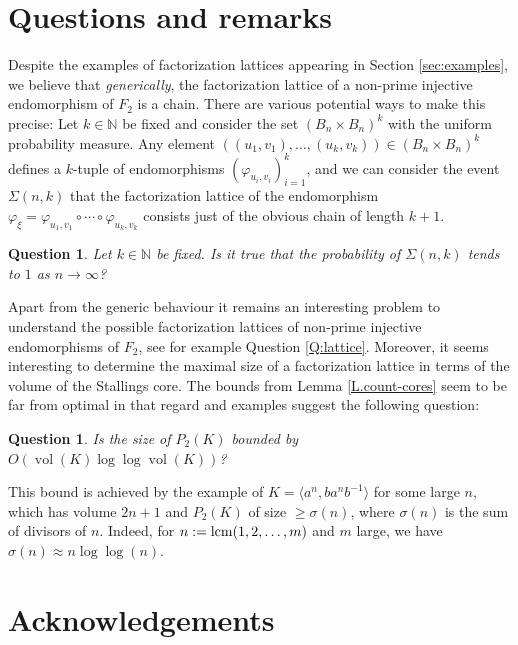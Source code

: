\documentclass{amsproc}
\newtheorem{question}[theorem]{Question}
\newcommand{\vol}{\operatorname{vol}}
\begin{document}
\section{Questions and remarks}\label{S.questions}

Despite the examples of factorization lattices appearing in Section \ref{sec:examples}, we believe that \emph{generically}, the factorization lattice of a non-prime injective endomorphism of $F_2$ is a chain. There are various potential ways to make this precise: Let $k \in \mathbb N$ be fixed and consider the set $(B_n \times B_n)^k$ with the uniform probability measure. Any element $((u_1,v_1),\ldots,(u_k,v_k)) \in (B_n \times B_n)^k$ defines a $k$-tuple of endomorphisms $(\varphi_{u_i,v_i})_{i=1}^k$, and we can consider the event $\Sigma(n,k)$ that the factorization lattice of the endomorphism $\varphi_\xi = \varphi_{u_1,v_1} \circ \cdots \circ \varphi_{u_k,v_k}$ consists just of the obvious chain of length $k+1$.

\begin{question}
    \label{Q.generic-chain} Let $k \in \mathbb N$ be fixed.
    Is it true that the probability of $\Sigma(n,k)$ tends to $1$ as $n \to \infty$?
\end{question}

Apart from the generic behaviour it remains an interesting problem to understand the possible factorization lattices of non-prime injective endomorphisms of $F_2$, see for example Question \ref{Q:lattice}. Moreover, it seems interesting to determine the maximal size of a factorization lattice in terms of the volume of the Stallings core. The bounds from Lemma \ref{L.count-cores} seem to be far from optimal in that regard and examples suggest the following question:

\begin{question}
Is the size of $P_2(K)$ bounded by $O(\vol(K) \log \log \vol(K))$?
\end{question}

This bound is achieved by the example of $K=\langle a^n,b a^n b^{-1}\rangle$ for some large $n$, which has volume $2n+1$ and $P_2(K)$ of size $\geq \sigma(n)$, where $\sigma(n)$ is the sum of divisors of $n$. Indeed, for $n:={\rm lcm}(1,2,\ldots,m)$ and $m$ large, we have $\sigma(n) \approx n \log\log(n)$.

\section*{Acknowledgements}
\end{document}
